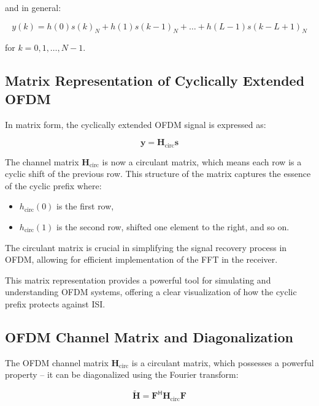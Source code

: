 and in general:

\begin{equation}
    y(k) = h(0)s(k)_N + h(1)s(k - 1)_N + \ldots + h(L - 1)s(k - L + 1)_N
\end{equation}

for \(k = 0, 1, \ldots, N-1\).

\subsection*{Matrix Representation of Cyclically Extended OFDM}

In matrix form, the cyclically extended OFDM signal is expressed as:

\begin{equation}
    \mathbf{y} = \mathbf{H}_{\text{circ}} \mathbf{s}
\end{equation}

The channel matrix \(\mathbf{H}_{\text{circ}}\) is now a circulant matrix, which means each row is a cyclic shift of the previous row. This structure of the matrix captures the essence of the cyclic prefix where:

\begin{itemize}
    \item \(h_{\text{circ}}(0)\) is the first row, 
    \item \(h_{\text{circ}}(1)\) is the second row, shifted one element to the right, and so on.
\end{itemize}

The circulant matrix is crucial in simplifying the signal recovery process in OFDM, allowing for efficient implementation of the FFT in the receiver.

This matrix representation provides a powerful tool for simulating and understanding OFDM systems, offering a clear visualization of how the cyclic prefix protects against ISI.

\subsection*{OFDM Channel Matrix and Diagonalization}

The OFDM channel matrix \(\mathbf{H}_{\text{circ}}\) is a circulant matrix, which possesses a powerful property – it can be diagonalized using the Fourier transform:

\begin{equation}
    \mathbf{\tilde{H}} = \mathbf{F}^\mathsf{H} \mathbf{H}_{\text{circ}} \mathbf{F}
\end{equation}

